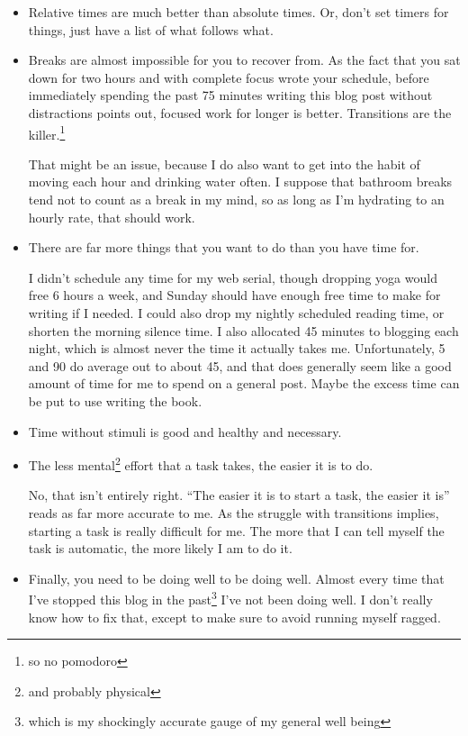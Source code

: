 \documentclass[12pt]{article}[titlepage]
\newcommand{\say}[1]{``#1''}
\renewcommand{\,}{\textsuperscript{,}}
\begin{document}
\begin{itemize}  
\item Relative times are much better than absolute times. Or, don't set timers for things, just have a list of what follows what.  
\item Breaks are almost impossible for you to recover from. As the fact that you sat down for two hours and with complete focus wrote your schedule, before immediately spending the past 75 minutes writing this blog post without distractions points out, focused work for longer is better. Transitions are the killer.\footnote{so no pomodoro}  
  
That might be an issue, because I do also want to get into the habit of moving each hour and drinking water often. I suppose that bathroom breaks tend not to count as a break in my mind, so as long as I'm hydrating to an hourly rate, that should work.  
\item There are far more things that you want to do than you have time for.

I didn't schedule any time for my web serial, though dropping yoga would free 6 hours a week, and Sunday should have enough free time to make for writing if I needed.  
I could also drop my nightly scheduled reading time, or shorten the morning silence time.  
I also allocated 45 minutes to blogging each night, which is almost never the time it actually takes me.  
Unfortunately, 5 and 90 do average out to about 45, and that does generally seem like a good amount of time for me to spend on a general post. Maybe the excess time can be put to use writing the book.  
\item Time without stimuli is good and healthy and necessary.  
\item The less mental\footnote{and probably physical} effort that a task takes, the easier it is to do.

No, that isn't entirely right.  
\say{The easier it is to start a task, the easier it is} reads as far more accurate to me.  
As the struggle with transitions implies, starting a task is really difficult for me.  
The more that I can tell myself the task is automatic, the more likely I am to do it.  
\item Finally, you need to be doing well to be doing well.  
Almost every time that I've stopped this blog in the past\footnote{which is my shockingly accurate gauge of my general well being} I've not been doing well.
I don't really know how to fix that, except to make sure to avoid running myself ragged.  
\end{itemize}
\end{document}
